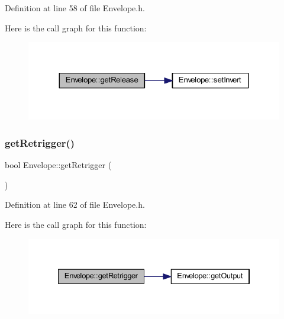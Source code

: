 Definition at line 58 of file Envelope.\+h.

Here is the call graph for this function\+:
\nopagebreak
\begin{figure}[H]
\begin{center}
\leavevmode
\includegraphics[width=324pt]{class_envelope_a96815367d569e8bdd8d5798475a0ab76_cgraph}
\end{center}
\end{figure}
\mbox{\label{class_envelope_a4d944da1edd2a5ca2dfa95482f933037}} 
\subsubsection{\texorpdfstring{get\+Retrigger()}{getRetrigger()}}
{\footnotesize\ttfamily bool Envelope\+::get\+Retrigger (\begin{DoxyParamCaption}{ }\end{DoxyParamCaption})\hspace{0.3cm}{\ttfamily [inline]}}



Definition at line 62 of file Envelope.\+h.

Here is the call graph for this function\+:
\nopagebreak
\begin{figure}[H]
\begin{center}
\leavevmode
\includegraphics[width=334pt]{class_envelope_a4d944da1edd2a5ca2dfa95482f933037_cgraph}
\end{center}
\end{figure}
\mbox{\label{class_envelope_a1d3627f6be1cce69aae37575b9bcdc69}} 
